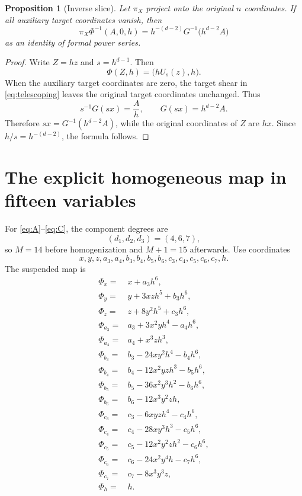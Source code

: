 \documentclass[11pt,reqno]{amsart}
\newtheorem{proposition}[theorem]{Proposition}
\begin{document}
\begin{proposition}[Inverse slice]\label{prop:inverse-slice}
Let $\pi_X$ project onto the original $n$ coordinates.  If all auxiliary
target coordinates vanish, then
\[
 \pi_X\Phi^{-1}(A,0,h)
 =h^{-(d-2)}G^{-1}\bigl(h^{d-2}A\bigr)
\]
as an identity of formal power series.
\end{proposition}

\begin{proof}
Write $Z=hz$ and $s=h^{d-1}$.  Then
\[
 \Phi(Z,h)=\bigl(hU_s(z),h\bigr).
\]
When the auxiliary target coordinates are zero, the target shear in
\eqref{eq:telescoping} leaves the original target coordinates unchanged.
Thus
\[
 s^{-1}G(sx)=\frac Ah,
 \qquad
 G(sx)=h^{d-2}A.
\]
Therefore $sx=G^{-1}(h^{d-2}A)$, while the original coordinates of $Z$ are
$hx$.  Since $h/s=h^{-(d-2)}$, the formula follows.
\end{proof}

\section{The explicit homogeneous map in fifteen variables}

For \eqref{eq:A}--\eqref{eq:C}, the component degrees are
\[
 (d_1,d_2,d_3)=(4,6,7),
\]
so $M=14$ before homogenization and $M+1=15$ afterwards.  Use coordinates
\[
 x,y,z,a_3,a_4,b_3,b_4,b_5,b_6,c_3,c_4,c_5,c_6,c_7,h.
\]
The suspended map is
\begin{align*}
\Phi_x={}&x+a_3h^6,\\
\Phi_y={}&y+3xzh^5+b_3h^6,\\
\Phi_z={}&z+8y^2h^5+c_3h^6,\\
\Phi_{a_3}={}&a_3+3x^2yh^4-a_4h^6,\\
\Phi_{a_4}={}&a_4+x^3zh^3,\\
\Phi_{b_3}={}&b_3-24xy^2h^4-b_4h^6,\\
\Phi_{b_4}={}&b_4-12x^2yzh^3-b_5h^6,\\
\Phi_{b_5}={}&b_5-36x^2y^3h^2-b_6h^6,\\
\Phi_{b_6}={}&b_6-12x^3y^2zh,\\
\Phi_{c_3}={}&c_3-6xyzh^4-c_4h^6,\\
\Phi_{c_4}={}&c_4-28xy^3h^3-c_5h^6,\\
\Phi_{c_5}={}&c_5-12x^2y^2zh^2-c_6h^6,\\
\Phi_{c_6}={}&c_6-24x^2y^4h-c_7h^6,\\
\Phi_{c_7}={}&c_7-8x^3y^3z,\\
\Phi_h={}&h.
\end{align*}
\end{document}
